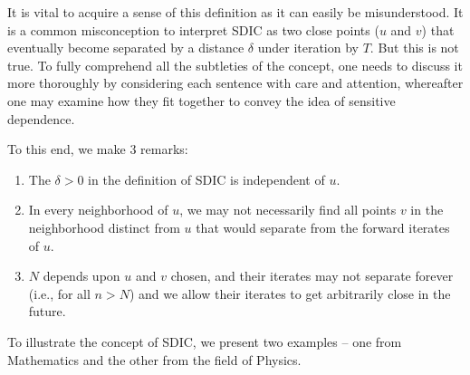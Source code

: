 It is vital to acquire a sense of this definition as it can easily be misunderstood. It is a common misconception to interpret SDIC as two close points ($u$ and $v$) that eventually become separated by a distance $\delta$ under iteration by $T$. But this is not true. To fully comprehend all the subtleties of the concept, one needs to discuss it more thoroughly by considering each sentence with care and attention, whereafter one may examine how they fit together to convey the idea of sensitive dependence. 

To this end, we make 3 remarks:
\vspace{-5mm}
\begin{enumerate}
  \item The $\delta>0$ in the definition of SDIC is independent of $u$. 
  \item In every neighborhood of $u$, we may not necessarily find all points $v$ in the neighborhood distinct from $u$ that would separate from the forward iterates of $u$. 
  \item  $N$ depends upon $u$ and $v$ chosen, and their iterates may not separate forever (i.e., for all $n>N$) and we allow their iterates to get arbitrarily close in the future. 
\end{enumerate}

To illustrate the concept of SDIC, we present two examples -- one from Mathematics and the other from the field of Physics.

